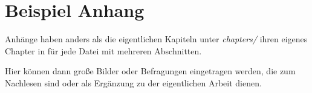 \chapter{Beispiel Anhang}

Anhänge haben anders als die eigentlichen Kapiteln unter \textit{chapters/} ihren eigenes Chapter in für jede Datei mit mehreren Abschnitten.

Hier können dann große Bilder oder Befragungen eingetragen werden, die zum Nachlesen sind oder als Ergänzung zu der eigentlichen Arbeit dienen.